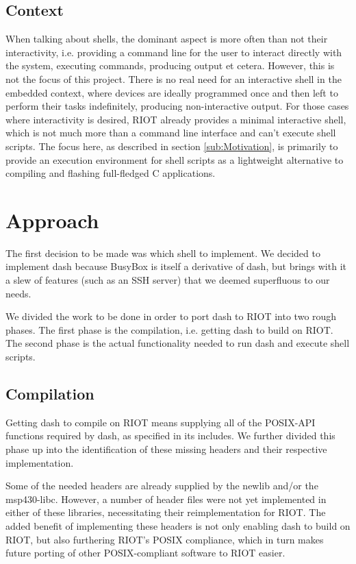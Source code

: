 \documentclass[conference]{IEEEtran}
\begin{document}
\subsection{Context}
\label{sub:Context}
When talking about shells, the dominant aspect is more often than not
their interactivity, i.e. providing a command line for the user to
interact directly with the system, executing commands, producing output
et cetera. However, this is not the focus of this project. There is no
real need for an interactive shell in the embedded context, where
devices are ideally programmed once and then left to perform their tasks
indefinitely, producing non-interactive output. For those cases where
interactivity is desired, RIOT already provides a minimal interactive
shell, which is not much more than a command line interface and can't
execute shell scripts. The focus here, as described in section
\ref{sub:Motivation}, is primarily to provide an execution environment
for shell scripts as a lightweight alternative to compiling and flashing
full-fledged C applications.

\section{Approach}
\label{sec:Approach}
The first decision to be made was which shell to implement. We decided to
implement dash because BusyBox is itself a derivative of dash, but
brings with it a slew of features (such as an SSH server) that we deemed
superfluous to our needs.

We divided the work to be done in order to port dash to RIOT into two
rough phases. The first phase is the compilation, i.e. getting dash to
build on RIOT. The second phase is the actual functionality needed to
run dash and execute shell scripts.

\subsection{Compilation}
\label{sub:Compilation}
Getting dash to compile on RIOT means supplying all of the POSIX-API
functions required by dash, as specified in its includes. We further
divided this phase up into the identification of these missing headers
and their respective implementation.

Some of the needed headers are already supplied by the newlib and/or the
msp430-libc. However, a number of header files were not yet implemented
in either of these libraries, necessitating their reimplementation for
RIOT. The added benefit of implementing these headers is not only
enabling dash to build on RIOT, but also furthering RIOT's POSIX
compliance, which in turn makes future porting of other POSIX-compliant
software to RIOT easier.
\end{document}
